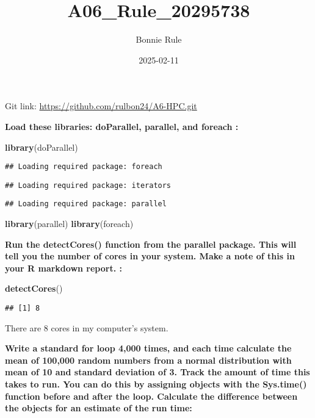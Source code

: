 \documentclass[
]{article}
\title{A06\_Rule\_20295738}
\author{Bonnie Rule}
\date{2025-02-11}
\newenvironment{Shaded}{\begin{snugshade}}{\end{snugshade}}
\newcommand{\FunctionTok}[1]{\textcolor[rgb]{0.13,0.29,0.53}{\textbf{#1}}}
\newcommand{\NormalTok}[1]{#1}
\begin{document}
\maketitle

Git link: \url{https://github.com/rulbon24/A6-HPC.git}

\textbf{Load these libraries: doParallel, parallel, and foreach :}

\begin{Shaded}
\begin{Highlighting}[]
\FunctionTok{library}\NormalTok{(doParallel)}
\end{Highlighting}
\end{Shaded}

\begin{verbatim}
## Loading required package: foreach
\end{verbatim}

\begin{verbatim}
## Loading required package: iterators
\end{verbatim}

\begin{verbatim}
## Loading required package: parallel
\end{verbatim}

\begin{Shaded}
\begin{Highlighting}[]
\FunctionTok{library}\NormalTok{(parallel)}
\FunctionTok{library}\NormalTok{(foreach)}
\end{Highlighting}
\end{Shaded}

\textbf{Run the detectCores() function from the parallel package. This
will tell you the number of cores in your system. Make a note of this in
your R markdown report. :}

\begin{Shaded}
\begin{Highlighting}[]
\FunctionTok{detectCores}\NormalTok{()}
\end{Highlighting}
\end{Shaded}

\begin{verbatim}
## [1] 8
\end{verbatim}

There are 8 cores in my computer's system.

\textbf{Write a standard for loop 4,000 times, and each time calculate
the mean of 100,000 random numbers from a normal distribution with mean
of 10 and standard deviation of 3. Track the amount of time this takes
to run. You can do this by assigning objects with the Sys.time()
function before and after the loop. Calculate the difference between the
objects for an estimate of the run time:}
\end{document}
